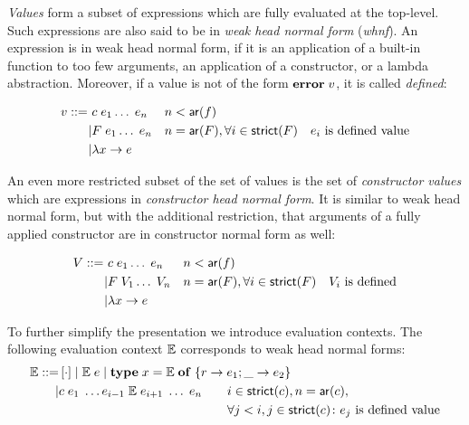 \emph{Values} form a subset of expressions which are fully evaluated
at the top-level. Such expressions are also said to be in \emph{weak
  head normal form} (\emph{whnf}). An expression is in weak head
normal form, if it is an application of a built-in function to too few
arguments, an application of a constructor, or a lambda
abstraction. Moreover, if a value is not of the form
$\mathbf{error}\; v$, it is called \emph{defined}:


\begin{center}
  \begin{align*}
    v \ebnf\ &c \; e_1 \dots \; e_n && n < \arity{f}%
    \\ \bnfsep &F \; e_1 \dots \; e_n && n = \arity{F}, \forall i \in
    \strict{F}\quad e_i \text{ is defined value} %
    \\ \bnfsep &\lambda x \to e %
  \end{align*}
\end{center}

An even more restricted subset of the set of values is the set of
\emph{constructor values} which are expressions in \emph{constructor
  head normal form}. It is similar to weak head normal form, but with
the additional restriction, that arguments of a fully applied
constructor are in constructor normal form as well:

\begin{align*}
  V \ebnf\ &c \; e_1 \dots \; e_n && n < \arity{f}%
  \\ \bnfsep &F \; V_1 \dots \; V_n && n = \arity{F}, \forall i \in
  \strict{F}\quad V_i \text{ is defined} %
  \\ \bnfsep &\lambda x \to e %
\end{align*}

To further simplify the presentation we introduce evaluation
contexts. The following evaluation context ${\mathbb E}$ corresponds to weak
head normal forms:
\begin{align*}
  {\mathbb E} ::= &\left[\cdot\right] \mid {\mathbb E} \; e \mid \mathbf{type}\;x =
    {\mathbb E}\;\mathbf{of}\;\{r \to e_1; \_ \to e_2\} \\ \mid &c\;
  e_1 \; \dots e_{i-1} \; {\mathbb E} \; e_{i+1} \; \dots \; e_n\qquad
  \begin{aligned}[t]
    &i\in \mathsf{strict}(c), n = \mathsf{ar}(c),\\
    &\forall j < i, j\in \mathsf{strict}(c)\colon e_j \text{ is defined value}
  \end{aligned}
\end{align*}

